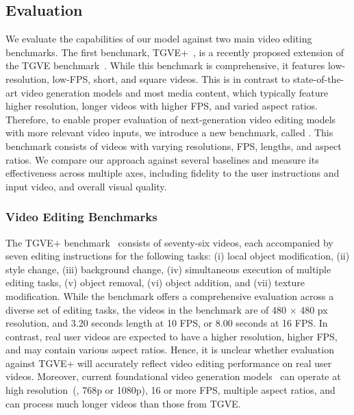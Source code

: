 \subsection{Evaluation}
\label{subsec:editing_eval}
We evaluate the capabilities of our model against two main video editing benchmarks.
The first benchmark, TGVE+~\citep{EVE}, is a recently proposed extension of the TGVE benchmark~\citep{wu2023cvpr}.
While this benchmark is comprehensive, it features low-resolution, low-FPS, short, and square videos.
This is in contrast to state-of-the-art video generation models and most media content, which typically feature higher resolution, longer videos with higher FPS, and varied aspect ratios.
Therefore, to enable proper evaluation of next-generation video editing models with more relevant video inputs, we introduce a new benchmark, called \OursVideoEditBench.
This benchmark consists of videos with varying resolutions, FPS, lengths, and aspect ratios.
We compare our approach against several baselines and measure its effectiveness across multiple axes, including fidelity to the user instructions and input video, and overall visual quality.

\subsubsection{Video Editing Benchmarks}
\label{edit:benchmark}
The TGVE+ benchmark~\citep{EVE,wu2023cvpr} consists of seventy-six videos, each accompanied by seven editing instructions for the following tasks: (i) local object modification, (ii) style change, (iii) background change, (iv) simultaneous execution of multiple editing tasks, (v) object removal, (vi) object addition, and (vii) texture modification.
While the benchmark offers a comprehensive evaluation across a diverse set of editing tasks, the videos in the benchmark are of 480 $\times$ 480 px resolution, and 3.20 seconds length at 10 FPS, or 8.00 seconds at 16 FPS.
In contrast, real user videos are expected to have a higher resolution, higher FPS, and may contain various aspect ratios.
Hence, it is unclear whether evaluation against TGVE+ will accurately reflect video editing performance on real user videos.
Moreover, current foundational video generation models~\citep{sora,gen2,gen3} can operate at high resolution~(\eg, 768p or 1080p), 16 or more FPS, multiple aspect ratios, and can process much longer videos than those from TGVE.

